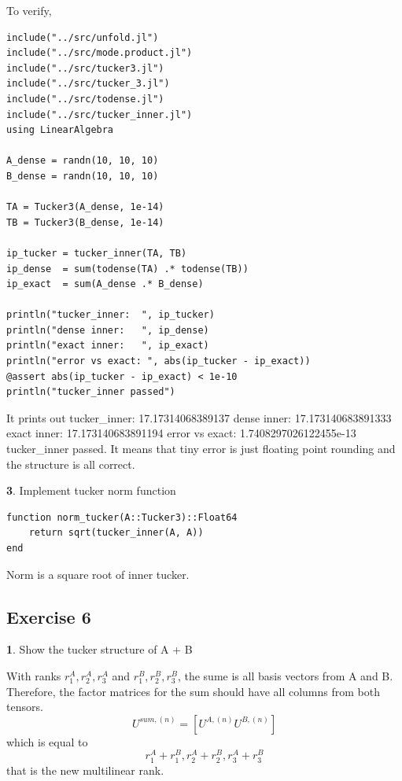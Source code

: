 \documentclass[11pt]{article}
\begin{document}
To verify,
\begin{lstlisting}
include("../src/unfold.jl")
include("../src/mode.product.jl")
include("../src/tucker3.jl")
include("../src/tucker_3.jl")
include("../src/todense.jl")
include("../src/tucker_inner.jl")
using LinearAlgebra

A_dense = randn(10, 10, 10)
B_dense = randn(10, 10, 10)

TA = Tucker3(A_dense, 1e-14)
TB = Tucker3(B_dense, 1e-14)

ip_tucker = tucker_inner(TA, TB)
ip_dense  = sum(todense(TA) .* todense(TB))
ip_exact  = sum(A_dense .* B_dense)

println("tucker_inner:  ", ip_tucker)
println("dense inner:   ", ip_dense)
println("exact inner:   ", ip_exact)
println("error vs exact: ", abs(ip_tucker - ip_exact))
@assert abs(ip_tucker - ip_exact) < 1e-10
println("tucker_inner passed")
\end{lstlisting}
It prints out tucker\_inner:  17.17314068389137
dense inner:   17.173140683891333
exact inner:   17.173140683891194
error vs exact: 1.7408297026122455e-13
tucker\_inner passed. It means that tiny error is just floating point rounding and the structure is all correct.

\vspace{1.5em}

\textbf{3}. Implement tucker norm function

\begin{lstlisting}
function norm_tucker(A::Tucker3)::Float64
    return sqrt(tucker_inner(A, A))
end
\end{lstlisting}

Norm is a square root of inner tucker.

\subsection*{Exercise 6}
\textbf{1}. Show the tucker structure of A + B

\vspace{1em}

With ranks $r_1^A, r_2^A, r_3^A$ and $r_1^B, r_2^B, r_3^B$, the sume is all basis vectors from A and B. Therefore, the factor matrices for the sum should have all columns from both tensors.
\[
U^{sum,(n)} = [U^{A,(n)} U^{B, (n)}]
\]
which is equal to
\[
r_1^A + r_1^B, r_2^A +r_2^B, r_3^A+r_3^B 
\]
that is the new multilinear rank.

\vspace{1em}
\end{document}
